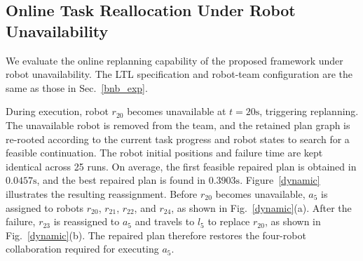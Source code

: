 \documentclass[lettersize,journal]{IEEEtran}
\theoremstyle{italiclemma}
\theoremstyle{italiclemma}
\theoremstyle{definition}
\begin{document}
\subsection{Online Task Reallocation Under Robot Unavailability}
We evaluate the online replanning capability of the proposed framework under robot unavailability. The LTL specification and robot-team configuration are the same as those in Sec.~\ref{bnb_exp}.


During execution, robot $r_{20}$ becomes unavailable at
$t=20 \mathrm{s}$, triggering replanning. The unavailable robot is removed from the team, and the retained plan graph is re-rooted according to the current task progress and robot states to search for a feasible continuation. The robot initial positions and failure time are kept identical across 25 runs. On average, the first feasible
repaired plan is obtained in $0.0457 \mathrm{s}$, and the best repaired plan is found in $0.3903 \mathrm{s}$. Figure~\ref{dynamic} illustrates the resulting reassignment. Before $r_{20}$ becomes unavailable, $a_5$ is assigned to robots $r_{20}$, $r_{21}$, $r_{22}$, and $r_{24}$, as shown in Fig.~\ref{dynamic}(a). After the failure, $r_{23}$ is reassigned to $a_5$ and travels to $l_5$ to replace $r_{20}$, as shown in Fig.~\ref{dynamic}(b). The repaired plan therefore restores the
four-robot collaboration required for executing $a_5$.

\end{document}
